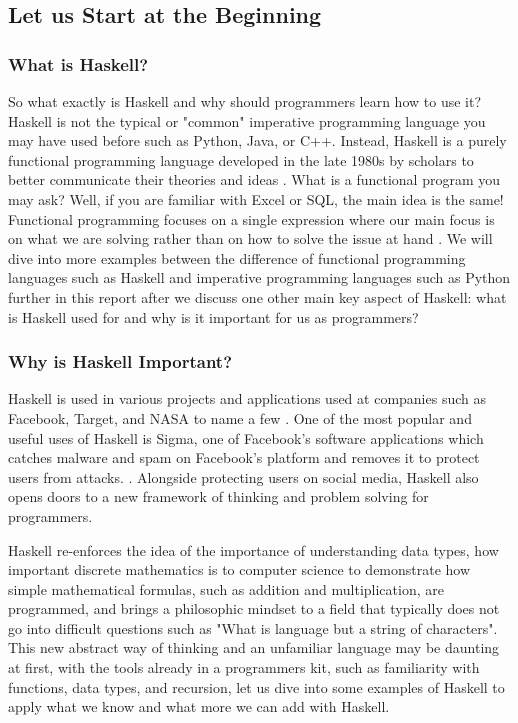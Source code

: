 \documentclass{article}
\begin{document}
\subsection{Let us Start at the Beginning}

\subsubsection{What is Haskell?}
So what exactly is Haskell and why should programmers learn how to use it? Haskell is not the typical or "common" imperative programming language you may have used before such as Python, Java, or C++. Instead, Haskell is a purely functional programming language developed in the late 1980s by scholars to better communicate their theories and ideas \cite{UPenn}. What is a functional program you may ask? Well, if you are familiar with Excel or SQL, the main idea is the same! Functional programming focuses on a single expression where our main focus is on what we are solving rather than on how to solve the issue at hand \cite{Haskell.org}. We will dive into more examples between the difference of functional programming languages such as Haskell and imperative programming languages such as Python further in this report after we discuss one other main key aspect of Haskell: what is Haskell used for and why is it important for us as programmers?

\medskip\noindent
\subsubsection{Why is Haskell Important?}
Haskell is used in various projects and applications used at companies such as Facebook, Target, and NASA to name a few \cite{serokell.io}. One of the most popular and useful uses of Haskell is Sigma, one of Facebook's software applications which catches malware and spam on Facebook's platform and removes it to protect users from attacks. \cite{Facebook Engineering}. Alongside protecting users on social media, Haskell also opens doors to a new framework of thinking and problem solving for programmers. 

\medskip\noindent
Haskell re-enforces the idea of the importance of understanding data types, how important discrete mathematics is to computer science to demonstrate how simple mathematical formulas, such as addition and multiplication, are programmed, and brings a philosophic mindset to a field that typically does not go into difficult questions such as "What is language but a string of characters". This new abstract way of thinking and an unfamiliar language may be daunting at first, with the tools already in a programmers kit, such as familiarity with functions, data types, and recursion, let us dive into some examples of Haskell to apply what we know and what more we can add with Haskell.
\end{document}
